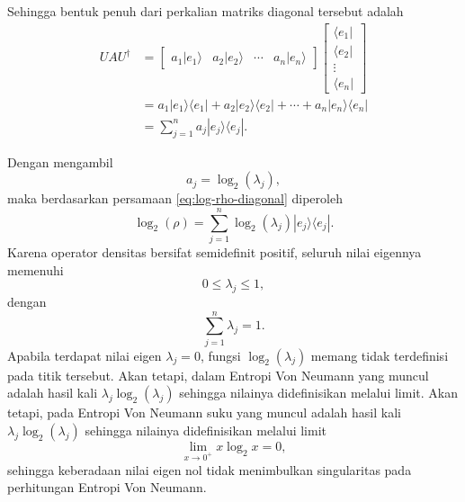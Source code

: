 Sehingga bentuk penuh dari perkalian matriks diagonal tersebut adalah
\begin{equation}
\begin{split}
UAU^\dagger
&=
\begin{bmatrix}
a_1|e_1\rangle&
a_2|e_2\rangle&
\cdots&
a_n|e_n\rangle
\end{bmatrix}
\begin{bmatrix}
\langle e_1|\\
\langle e_2|\\
\vdots\\
\langle e_n|
\end{bmatrix}
\\
&=
a_1|e_1\rangle\langle e_1|
+
a_2|e_2\rangle\langle e_2|
+\cdots+
a_n|e_n\rangle\langle e_n|
\\
&=
\sum_{j=1}^{n}
a_j
|e_j\rangle
\langle e_j|.
\end{split}
\end{equation}

Dengan mengambil
\[
a_j=\log_2(\lambda_j),
\]
maka berdasarkan persamaan \eqref{eq:log-rho-diagonal} diperoleh
\begin{equation}
\log_2(\rho)
=
\sum_{j=1}^{n}
\log_2(\lambda_j)
|e_j\rangle
\langle e_j|.
\end{equation}
Karena operator densitas bersifat semidefinit positif, seluruh nilai eigennya memenuhi
\[
0\le\lambda_j\le1,
\]
dengan
\[
\sum_{j=1}^{n}\lambda_j=1.
\]
Apabila terdapat nilai eigen $\lambda_j=0$, fungsi $\log_2(\lambda_j)$ memang tidak terdefinisi pada titik tersebut. Akan tetapi, dalam Entropi Von Neumann yang muncul adalah hasil kali $\lambda_j\log_2(\lambda_j)$ sehingga nilainya didefinisikan melalui limit. Akan tetapi, pada Entropi Von Neumann suku yang muncul adalah hasil kali $\lambda_j\log_2(\lambda_j)$ sehingga nilainya didefinisikan melalui limit
\begin{equation}
\lim_{x\rightarrow0^{+}}
x\log_2x
=
0,
\end{equation}
sehingga keberadaan nilai eigen nol tidak menimbulkan singularitas pada perhitungan Entropi Von Neumann. 
